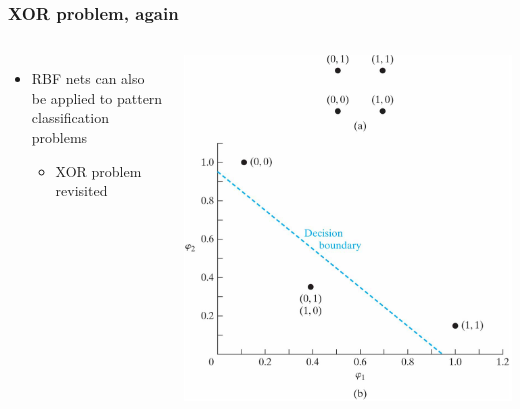 \documentclass[12pt,notes,mathserif]{beamer}
\begin{document}
\begin{frame}
	\frametitle{XOR problem, again}
	\begin{columns}
		\begin{itemize}
			\item RBF nets can also be applied to pattern classification problems
			      \begin{itemize}
				      \item XOR problem revisited
			      \end{itemize}
		\end{itemize}
		\begin{center}\hspace*{-5mm}
			\includegraphics[width=1.15\linewidth]{fig/lec738.jpg}
		\end{center}
	\end{columns}
\end{frame}
\end{document}
